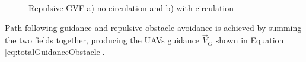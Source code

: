 \documentclass[conf]{new-aiaa}
\begin{document}
\begin{figure}[H]
	\begin{subfigmatrix}{2}%
		\centering	
		\hspace*{0mm}
	\end{subfigmatrix}
	\caption{Repulsive GVF a) no circulation and b) with circulation}
	\label{fig:decayApplied}
\end{figure} 





Path following guidance and repulsive obstacle avoidance is achieved by summing the two fields together, producing the UAVs guidance $\overrightarrow{V}_G$ shown in Equation \ref{eq:totalGuidanceObstacle}.
\end{document}
